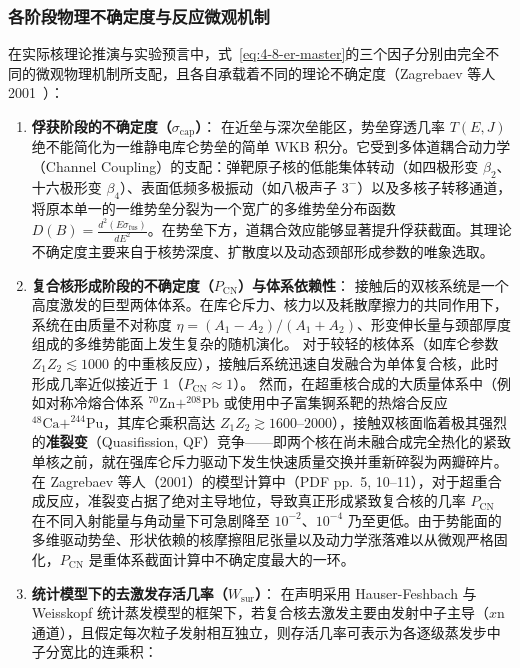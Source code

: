 \subsubsection{各阶段物理不确定度与反应微观机制}

在实际核理论推演与实验预言中，式~\eqref{eq:4-8-er-master}的三个因子分别由完全不同的微观物理机制所支配，且各自承载着不同的理论不确定度（Zagrebaev 等人 2001~\cite{zagrebaev-2001-superheavy-synthesis-survival}）：
\begin{enumerate}
\item \textbf{俘获阶段的不确定度（$\sigma_{\mathrm{cap}}$）}：
在近垒与深次垒能区，势垒穿透几率 $T(E, J)$ 绝不能简化为一维静电库仑势垒的简单 WKB 积分。它受到多体道耦合动力学（Channel Coupling）的支配：弹靶原子核的低能集体转动（如四极形变 $\beta_2$、十六极形变 $\beta_4$）、表面低频多极振动（如八极声子 $3^-$）以及多核子转移通道，将原本单一的一维势垒分裂为一个宽广的多维势垒分布函数 $D(B) = \frac{d^2(E \sigma_{\mathrm{fus}})}{dE^2}$。在势垒下方，道耦合效应能够显著提升俘获截面。其理论不确定度主要来自于核势深度、扩散度以及动态颈部形成参数的唯象选取。
\item \textbf{复合核形成阶段的不确定度（$P_{\mathrm{CN}}$）与体系依赖性}：
接触后的双核系统是一个高度激发的巨型两体体系。在库仑斥力、核力以及耗散摩擦力的共同作用下，系统在由质量不对称度 $\eta = (A_1 - A_2)/(A_1 + A_2)$、形变伸长量与颈部厚度组成的多维势能面上发生复杂的随机演化。
对于较轻的核体系（如库仑参数 $Z_1 Z_2 \lesssim 1000$ 的中重核反应），接触后系统迅速自发融合为单体复合核，此时形成几率近似接近于 1（$P_{\mathrm{CN}} \approx 1$）。
然而，在超重核合成的大质量体系中（例如对称冷熔合体系 $^{70}\mathrm{Zn} + ^{208}\mathrm{Pb}$ 或使用中子富集锕系靶的热熔合反应 $^{48}\mathrm{Ca} + ^{244}\mathrm{Pu}$，其库仑乘积高达 $Z_1 Z_2 \gtrsim 1600$--$2000$），接触双核面临着极其强烈的\textbf{准裂变}（Quasifission, QF）竞争——即两个核在尚未融合成完全热化的紧致单核之前，就在强库仑斥力驱动下发生快速质量交换并重新碎裂为两瓣碎片。在 Zagrebaev 等人（2001）的模型计算中（PDF pp.~5, 10--11），对于超重合成反应，准裂变占据了绝对主导地位，导致真正形成紧致复合核的几率 $P_{\mathrm{CN}}$ 在不同入射能量与角动量下可急剧降至 $10^{-2}$、$10^{-4}$ 乃至更低。由于势能面的多维驱动势垒、形状依赖的核摩擦阻尼张量以及动力学涨落难以从微观严格固化，$P_{\mathrm{CN}}$ 是重体系截面计算中不确定度最大的一环。
\item \textbf{统计模型下的去激发存活几率（$W_{\mathrm{sur}}$）}：
在声明采用 Hauser-Feshbach 与 Weisskopf 统计蒸发模型的框架下，若复合核去激发主要由发射中子主导（$x\mathrm{n}$ 通道），且假定每次粒子发射相互独立，则存活几率可表示为各逐级蒸发步中子分宽比的连乘积：

\end{enumerate}
